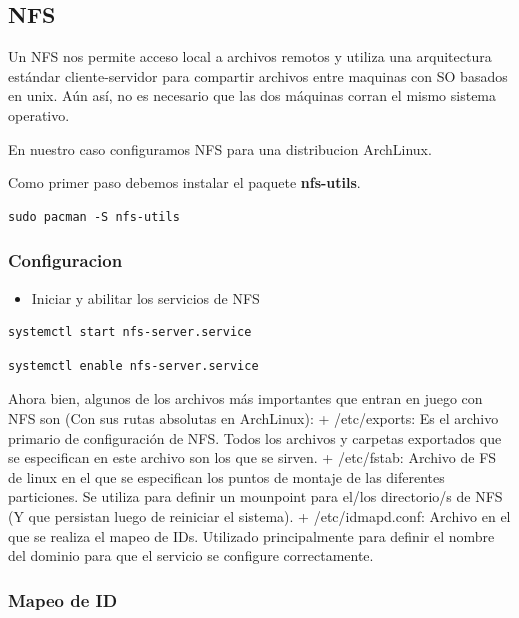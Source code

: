 \documentclass[12pt]{extarticle}
\providecommand{\tightlist}{%
      \setlength{\itemsep}{0pt}\setlength{\parskip}{0pt}}
\begin{document}
    \subsection{NFS}\label{nfs}

Un NFS nos permite acceso local a archivos remotos y utiliza una
arquitectura estándar cliente-servidor para compartir archivos entre
maquinas con SO basados en unix. Aún así, no es necesario que las dos
máquinas corran el mismo sistema operativo.

En nuestro caso configuramos NFS para una distribucion ArchLinux.

Como primer paso debemos instalar el paquete \textbf{nfs-utils}.

\begin{verbatim}
sudo pacman -S nfs-utils
\end{verbatim}

\subsubsection{Configuracion}\label{configuracion}

\begin{itemize}
\tightlist
\item
  Iniciar y abilitar los servicios de NFS
\end{itemize}

\begin{verbatim}
systemctl start nfs-server.service
\end{verbatim}

\begin{verbatim}
systemctl enable nfs-server.service
\end{verbatim}

Ahora bien, algunos de los archivos más importantes que entran en juego
con NFS son (Con sus rutas absolutas en ArchLinux): + /etc/exports: Es
el archivo primario de configuración de NFS. Todos los archivos y
carpetas exportados que se especifican en este archivo son los que se
sirven. + /etc/fstab: Archivo de FS de linux en el que se especifican
los puntos de montaje de las diferentes particiones. Se utiliza para
definir un mounpoint para el/los directorio/s de NFS (Y que persistan
luego de reiniciar el sistema). + /etc/idmapd.conf: Archivo en el que se
realiza el mapeo de IDs. Utilizado principalmente para definir el nombre
del dominio para que el servicio se configure correctamente.

\subsubsection{Mapeo de ID}\label{mapeo-de-id}
\end{document}
